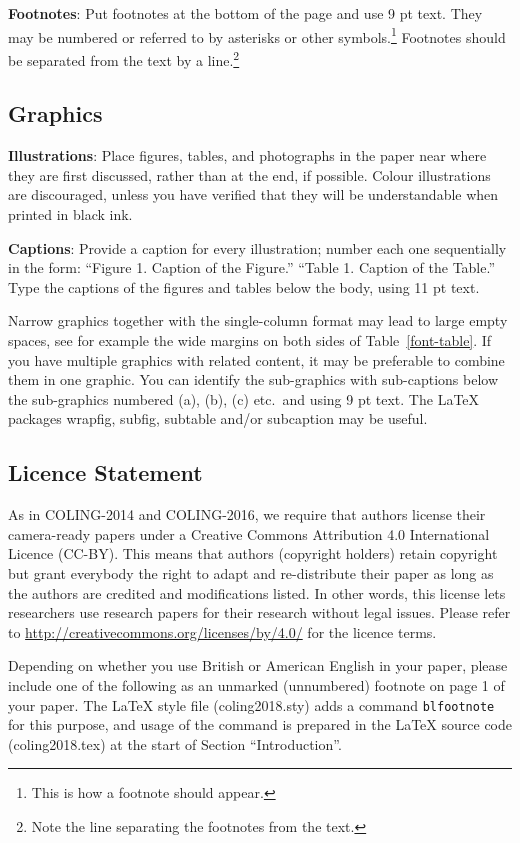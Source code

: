 \documentclass[11pt]{article}
\begin{document}
{\bf Footnotes}: Put footnotes at the bottom of the page and use 9 pt
text. They may be numbered or referred to by asterisks or other
symbols.\footnote{This is how a footnote should appear.} Footnotes
should be separated from the text by a line.\footnote{Note the line
separating the footnotes from the text.}

\subsection{Graphics}

{\bf Illustrations}: Place figures, tables, and photographs in the
paper near where they are first discussed, rather than at the end, if
possible. 
Colour
illustrations are discouraged, unless you have verified that  
they will be understandable when printed in black ink.

{\bf Captions}: Provide a caption for every illustration; number each one
sequentially in the form:  ``Figure 1. Caption of the Figure.'' ``Table 1.
Caption of the Table.''  Type the captions of the figures and 
tables below the body, using 11 pt text.

Narrow graphics together with the single-column format may lead to
large empty spaces,
see for example the wide margins on both sides of Table~\ref{font-table}.
If you have multiple graphics with related content, it may be
preferable to combine them in one graphic.
You can identify the sub-graphics with sub-captions below the
sub-graphics numbered (a), (b), (c) etc.\ and using 9 pt text.
The \LaTeX{} packages wrapfig, subfig, subtable and/or subcaption
may be useful.


\subsection{Licence Statement}
\label{licence}

As in COLING-2014 and COLING-2016, 
we require that authors license their
camera-ready papers under a
Creative Commons Attribution 4.0 International Licence
(CC-BY).
This means that authors (copyright holders) retain copyright but
grant everybody 
the right to adapt and re-distribute their paper 
as long as the authors are credited and modifications listed.
In other words, this license lets researchers use research papers for their research without legal issues.
Please refer to 
\url{http://creativecommons.org/licenses/by/4.0/} for the
licence terms.  

Depending on whether you use British or American English in your
paper, please include one of the following as an unmarked
(unnumbered) footnote on page 1 of your paper.
The \LaTeX{} style file (coling2018.sty) adds a command
\texttt{blfootnote} for this purpose, and usage of the command is
prepared in the \LaTeX{} source code (coling2018.tex) at the start
of Section ``Introduction''.
\end{document}
